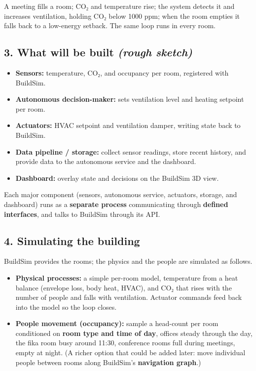 \documentclass[
  11pt,
]{article}
\providecommand{\tightlist}{%
  \setlength{\itemsep}{0pt}\setlength{\parskip}{0pt}}
\begin{document}
A meeting fills a room; CO₂ and temperature rise; the system detects it
and increases ventilation, holding CO₂ below 1000 ppm; when the room
empties it falls back to a low-energy setback. The same loop runs in
every room.

\hypertarget{what-well-build-rough-sketch}{%
\subsection{\texorpdfstring{3. What will be built \emph{(rough
sketch)}}{3. What will be built (rough sketch)}}\label{what-well-build-rough-sketch}}

\begin{itemize}
\tightlist
\item
  \textbf{Sensors:} temperature, CO₂, and occupancy per room, registered
  with BuildSim.
\item
  \textbf{Autonomous decision-maker:} sets ventilation level and heating
  setpoint per room.
\item
  \textbf{Actuators:} HVAC setpoint and ventilation damper, writing
  state back to BuildSim.
\item
  \textbf{Data pipeline / storage:} collect sensor readings, store
  recent history, and provide data to the autonomous service and the
  dashboard.
\item
  \textbf{Dashboard:} overlay state and decisions on the BuildSim 3D
  view.
\end{itemize}

Each major component (sensors, autonomous service, actuators, storage,
and dashboard) runs as a \textbf{separate process} communicating through
\textbf{defined interfaces}, and talks to BuildSim through its API.

\hypertarget{simulating-the-building}{%
\subsection{4. Simulating the building}\label{simulating-the-building}}

BuildSim provides the rooms; the physics and the people are simulated as
follows.

\begin{itemize}
\tightlist
\item
  \textbf{Physical processes:} a simple per-room model, temperature
  from a heat balance (envelope loss, body heat, HVAC), and CO₂ that
  rises with the number of people and falls with ventilation. Actuator
  commands feed back into the model so the loop closes.
\item
  \textbf{People movement (occupancy):} sample a head-count per room
  conditioned on \textbf{room type and time of day}, offices steady
  through the day, the fika room busy around 11:30, conference rooms full
  during meetings, empty at night. (A richer option that could be added
  later: move individual people between rooms along BuildSim's
  \textbf{navigation graph}.)
\end{itemize}
\end{document}
